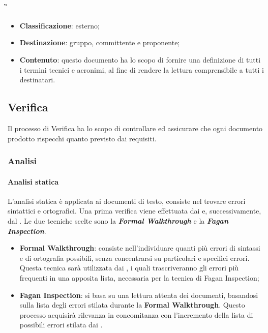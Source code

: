 			\paragraph{\G}
			\begin{itemize}
				\item \textbf{Classificazione}: esterno;
				\item \textbf{Destinazione}: gruppo, committente e proponente;
				\item \textbf{Contenuto}: questo documento ha lo scopo di fornire una definizione di tutti i termini tecnici e acronimi, al fine di rendere la lettura comprensibile a tutti i destinatari.
			\end{itemize}

	\subsection{Verifica}
	Il processo di Verifica ha lo scopo di controllare ed assicurare che ogni documento prodotto rispecchi quanto previsto dai requisiti.

		\subsubsection{Analisi}

			\paragraph{Analisi statica}
			L'analisi statica è applicata ai documenti di testo, consiste nel trovare errori sintattici e ortografici. Una prima verifica viene effettuata dai \textit{\Vers} e, successivamente, dal \textit{\RdP}. Le due tecniche scelte sono la \textbf{\textit{Formal Walkthrough}} e la \textbf{\textit{Fagan Inspection}}.
			\begin{itemize}
				\item \textbf{Formal Walkthrough}: consiste nell'individuare quanti più errori di sintassi e di ortografia possibili, senza concentrarsi su particolari e specifici errori. Questa tecnica sarà utilizzata dai \textit{\Vers}, i quali trascriveranno gli errori più frequenti in una apposita lista, necessaria per la tecnica di Fagan Inspection;
				\item \textbf{Fagan Inspection}: si basa su una lettura attenta dei documenti, basandosi sulla lista degli errori stilata durante la \textbf{Formal Walkthrough}. Questo processo acquisirà rilevanza in concomitanza con l'incremento della lista di possibili errori stilata dai \textit{\Vers}.
			\end{itemize}

